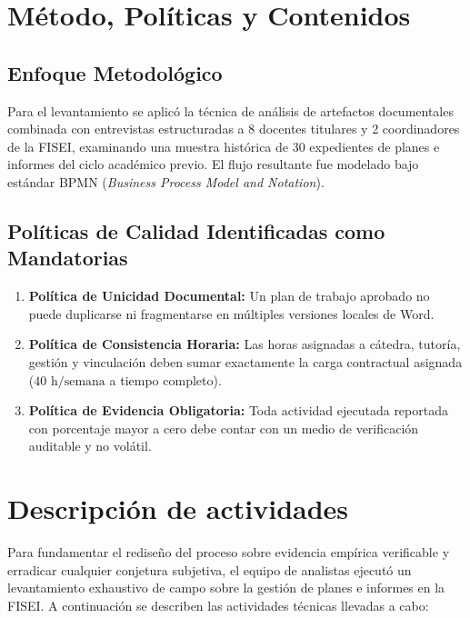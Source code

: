 \documentclass[12pt,a4paper]{article}
\begin{document}
\section{Método, Políticas y Contenidos}
\subsection{Enfoque Metodológico}
Para el levantamiento se aplicó la técnica de análisis de artefactos documentales combinada con entrevistas estructuradas a 8 docentes titulares y 2 coordinadores de la FISEI, examinando una muestra histórica de 30 expedientes de planes e informes del ciclo académico previo. El flujo resultante fue modelado bajo estándar BPMN (\textit{Business Process Model and Notation}).

\subsection{Políticas de Calidad Identificadas como Mandatorias}
\begin{enumerate}[leftmargin=1.5em, itemsep=2pt]
    \item \textbf{Política de Unicidad Documental:} Un plan de trabajo aprobado no puede duplicarse ni fragmentarse en múltiples versiones locales de Word.
    \item \textbf{Política de Consistencia Horaria:} Las horas asignadas a cátedra, tutoría, gestión y vinculación deben sumar exactamente la carga contractual asignada ($40\text{ h/semana}$ a tiempo completo).
    \item \textbf{Política de Evidencia Obligatoria:} Toda actividad ejecutada reportada con porcentaje mayor a cero debe contar con un medio de verificación auditable y no volátil.
\end{enumerate}

\section{Descripción de actividades}
Para fundamentar el rediseño del proceso sobre evidencia empírica verificable y erradicar cualquier conjetura subjetiva, el equipo de analistas ejecutó un levantamiento exhaustivo de campo sobre la gestión de planes e informes en la FISEI. A continuación se describen las actividades técnicas llevadas a cabo:
\end{document}
